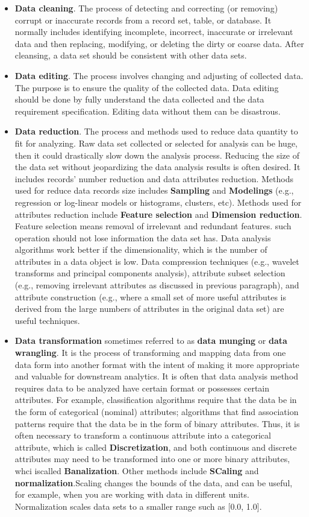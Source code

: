 \documentclass[
]{book}
\begin{document}
\begin{itemize}
\item
  \textbf{Data cleaning}. The process of detecting and correcting (or removing) corrupt or inaccurate records from a record set, table, or database. It normally includes identifying incomplete, incorrect, inaccurate or irrelevant data and then replacing, modifying, or deleting the dirty or coarse data. After cleansing, a data set should be consistent with other data sets.
\item
  \textbf{Data editing}. The process involves changing and adjusting of collected data. The purpose is to ensure the quality of the collected data. Data editing should be done by fully understand the data collected and the data requirement specification. Editing data without them can be disastrous.
\item
  \textbf{Data reduction}. The process and methods used to reduce data quantity to fit for analyzing. Raw data set collected or selected for analysis can be huge, then it could drastically slow down the analysis process. Reducing the size of the data set without jeopardizing the data analysis results is often desired. It includes records' number reduction and data attributes reduction. Methods used for reduce data records size includes \textbf{Sampling} and \textbf{Modelings} (e.g., regression or log-linear models or histograms, clusters, etc). Methods used for attributes reduction include \textbf{Feature selection} and \textbf{Dimension reduction}. Feature selection means removal of irrelevant and redundant features. such operation should not lose information the data set has. Data analysis algorithms work better if the dimensionality, which is the number of attributes in a data object is low. Data compression techniques (e.g., wavelet transforms and principal components analysis), attribute subset selection (e.g., removing irrelevant attributes as discussed in previous paragraph), and attribute construction (e.g., where a small set of more useful attributes is derived from the large numbers of attributes in the original data set) are useful techniques.
\item
  \textbf{Data transformation} sometimes referred to as \textbf{data munging} or \textbf{data wrangling}. It is the process of transforming and mapping data from one data form into another format with the intent of making it more appropriate and valuable for downstream analytics. It is often that data analysis method requires data to be analyzed have certain format or possesses certain attributes. For example, classification algorithms require that the data be in the form of categorical (nominal) attributes; algorithms that find association patterns require that the data be in the form of binary attributes. Thus, it is often necessary to transform a continuous attribute into a categorical attribute, which is called \textbf{Discretization}, and both continuous and discrete attributes may need to be transformed into one or more binary attributes, whci iscalled \textbf{Banalization}. Other methods include \textbf{SCaling} and \textbf{normalization}.Scaling changes the bounds of the data, and can be useful, for example, when you are working with data in different units. Normalization scales data sets to a smaller range such as {[}0.0, 1.0{]}.

\end{itemize}
\end{document}

